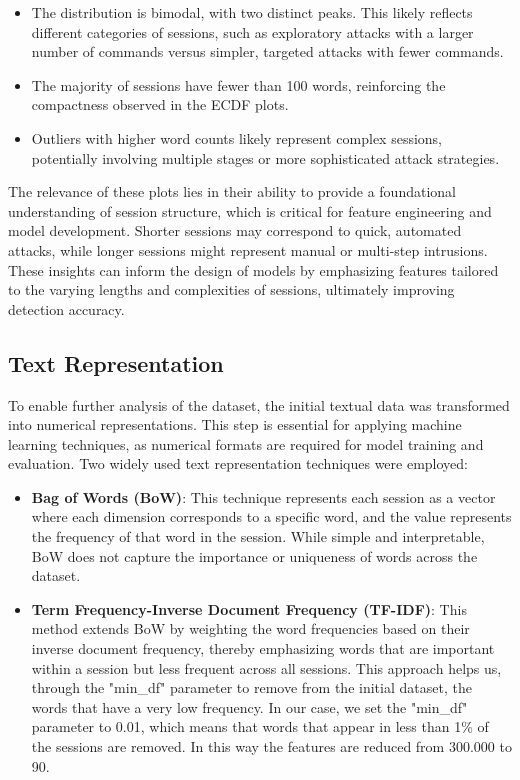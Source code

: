         \begin{itemize}
        
            \item The distribution is bimodal, with two distinct peaks. This likely reflects different categories of sessions, such as exploratory attacks with a larger number of commands versus simpler, targeted attacks with fewer commands.
            
            \item The majority of sessions have fewer than 100 words, reinforcing the compactness observed in the ECDF plots.
            
            \item Outliers with higher word counts likely represent complex sessions, potentially involving multiple stages or more sophisticated attack strategies.
            
        \end{itemize}

        The relevance of these plots lies in their ability to provide a foundational understanding of session structure, which is critical for feature engineering and model development. Shorter sessions may correspond to quick, automated attacks, while longer sessions might represent manual or multi-step intrusions. These insights can inform the design of models by emphasizing features tailored to the varying lengths and complexities of sessions, ultimately improving detection accuracy.

    \subsection{Text Representation}

        To enable further analysis of the dataset, the initial textual data was transformed into numerical representations. This step is essential for applying machine learning techniques, as numerical formats are required for model training and evaluation. Two widely used text representation techniques were employed:

        \begin{itemize}
            \item \textbf{Bag of Words (BoW)}: This technique represents each session as a vector where each dimension corresponds to a specific word, and the value represents the frequency of that word in the session. While simple and interpretable, BoW does not capture the importance or uniqueness of words across the dataset.
            \item \textbf{Term Frequency-Inverse Document Frequency (TF-IDF)}: This method extends BoW by weighting the word frequencies based on their inverse document frequency, thereby emphasizing words that are important within a session but less frequent across all sessions. This approach helps us, through the "min\_df" parameter to remove from the initial dataset, the words that have a very low frequency. In our case, we set the "min\_df" parameter to 0.01, which means that words that appear in less than 1\% of the sessions are removed. In this way the features are reduced from 300.000 to 90.
        \end{itemize}


